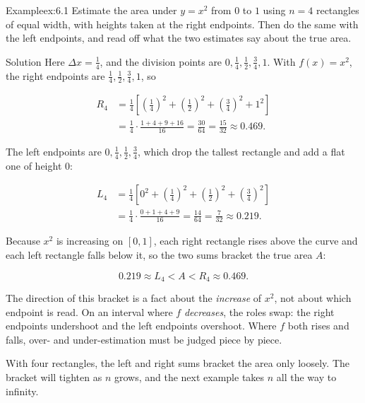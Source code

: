 \documentclass[a4paper,12pt,oneside]{memoir}
\begin{document}
\begin{workedexample}
\begin{envexample}{Example}{ex:6.1}{}
Estimate the area under \(y = x^{2}\) from \(0\) to \(1\) using \(n = 4\) rectangles of equal width, with heights taken at the right endpoints. Then do the same with the left endpoints, and read off what the two estimates say about the true area.
\end{envexample}
\begin{envsolution}{Solution}{}{}
Here \(\Delta x = \tfrac{1}{4}\), and the division points are \(0, \tfrac14, \tfrac12, \tfrac34, 1\). With \(f(x) = x^{2}\), the right endpoints are \(\tfrac14, \tfrac12, \tfrac34, 1\), so

\[ \begin{aligned}
          R_{4} &= \tfrac{1}{4}\!\left[\left(\tfrac14\right)^{2} + \left(\tfrac12\right)^{2} + \left(\tfrac34\right)^{2} + 1^{2}\right] \\[2pt]
                &= \tfrac{1}{4}\cdot\frac{1 + 4 + 9 + 16}{16} = \frac{30}{64} = \frac{15}{32} \approx 0.469.
        \end{aligned} \]

The left endpoints are \(0, \tfrac14, \tfrac12, \tfrac34\), which drop the tallest rectangle and add a flat one of height \(0\):

\[ \begin{aligned}
          L_{4} &= \tfrac{1}{4}\!\left[0^{2} + \left(\tfrac14\right)^{2} + \left(\tfrac12\right)^{2} + \left(\tfrac34\right)^{2}\right] \\[2pt]
                &= \tfrac{1}{4}\cdot\frac{0 + 1 + 4 + 9}{16} = \frac{14}{64} = \frac{7}{32} \approx 0.219.
        \end{aligned} \]

Because \(x^{2}\) is increasing on \([0, 1]\), each right rectangle rises above the curve and each left rectangle falls below it, so the two sums bracket the true area \(A\):

\[ 0.219 \approx L_{4} < A < R_{4} \approx 0.469. \]

The direction of this bracket is a fact about the \emph{increase} of \(x^{2}\), not about which endpoint is read. On an interval where \(f\) \emph{decreases}, the roles swap: the right endpoints undershoot and the left endpoints overshoot. Where \(f\) both rises and falls, over- and under-estimation must be judged piece by piece.

With four rectangles, the left and right sums bracket the area only loosely. The bracket will tighten as \(n\) grows, and the next example takes \(n\) all the way to infinity. \qedmark
\end{envsolution}
\end{workedexample}
\end{document}
